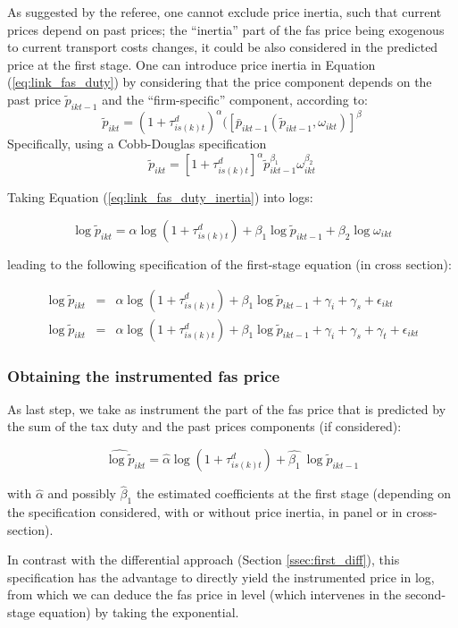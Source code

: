 \documentclass[11pt,twoside, authoryear]{elsarticle}
\begin{document}
As suggested by the referee, one cannot exclude price inertia, such that current prices depend on past prices; the ``inertia'' part of the fas price being exogenous to current transport costs changes, it could be also considered in the predicted price at the first stage. One can introduce price inertia in Equation (\ref{eq:link_fas_duty}) by considering that the price component depends on the past price $\widetilde{p}_{ikt-1}$ and the ``firm-specific'' component, according to:
$$\widetilde{p}_{ikt} = (1+\tau^d_{is(k)t})^\alpha (\left[\bar{p}_{ikt-1}(\widetilde{p}_{ikt-1}, \omega_{ikt})\right]^\beta $$
Specifically, using a Cobb-Douglas specification
\begin{equation}
\widetilde{p}_{ikt} = \left[1+\tau^d_{is(k)t}\right]^\alpha \widetilde{p}^{\beta_1}_{ikt-1}\omega_{ikt}^{\beta_2} \label{eq:link_fas_duty_inertia}
\end{equation}

Taking Equation (\ref{eq:link_fas_duty_inertia}) into logs:

$$\log \widetilde{p}_{ikt} = \alpha \log\left(1+\tau^d_{is(k)t}\right) + \beta_1 \log \widetilde{p}_{ikt-1}+ \beta_2\log \omega_{ikt}$$

leading to the following specification of the first-stage equation (in cross section):

\begin{eqnarray}
\log \widetilde{p}_{ikt} &=& \alpha \log\left(1+\tau^d_{is(k)t}\right) + \beta_1 \log \widetilde{p}_{ikt-1}+ \gamma_i +\gamma_s +\epsilon_{ikt} \label{eq:FS_loglevel_cross_section_inertia}   \\
\log \widetilde{p}_{ikt} &=& \alpha \log\left(1+\tau^d_{is(k)t}\right) + \beta_1 \log \widetilde{p}_{ikt-1}+ \gamma_i +\gamma_s + \gamma_t+ \epsilon_{ikt} \label{eq:FS_loglevel_cross_section_panel}
\end{eqnarray}


\subsubsection{Obtaining the instrumented fas price}

As last step, we take as instrument the part of the fas price that is predicted by the sum of the tax duty and the past prices components (if considered):

$$\widehat{\log \widetilde{p}}_{ikt} = \widehat{ \alpha} \log\left(1+\tau^d_{is(k)t}\right) +  \widehat{\beta_1}\ \log \widetilde{p}_{ikt-1} $$

\noindent with $ \widehat{ \alpha}$ and possibly $ \widehat{\beta}_1$ the estimated coefficients at the first stage (depending on the specification considered, with or without price inertia, in panel or in cross-section).

In contrast with the differential approach (Section \ref{ssec:first_diff}), this specification has the advantage to directly yield the instrumented price in log, from which we can deduce the fas price in level (which intervenes in the second-stage equation) by taking the exponential.
\end{document}
